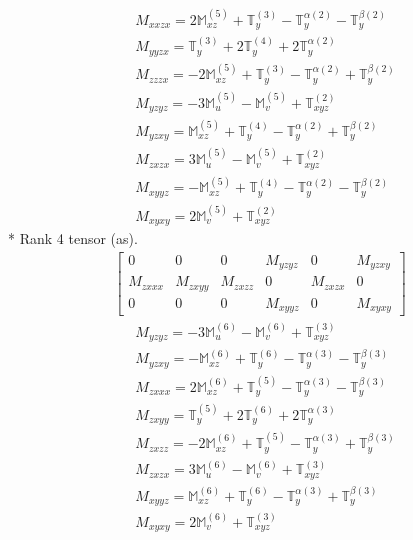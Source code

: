 \documentclass[fleqn,8pt,landscape]{jsarticle}
\begin{document}
\begin{align*}
& M_{xxzx} = 2 \mathbb{M}_{xz}^{(5)} + \mathbb{T}_{y}^{(3)} - \mathbb{T}_{y}^{\alpha(2)} - \mathbb{T}_{y}^{\beta(2)} \\
& M_{yyzx} = \mathbb{T}_{y}^{(3)} + 2 \mathbb{T}_{y}^{(4)} + 2 \mathbb{T}_{y}^{\alpha(2)} \\
& M_{zzzx} = - 2 \mathbb{M}_{xz}^{(5)} + \mathbb{T}_{y}^{(3)} - \mathbb{T}_{y}^{\alpha(2)} + \mathbb{T}_{y}^{\beta(2)} \\
& M_{yzyz} = - 3 \mathbb{M}_{u}^{(5)} - \mathbb{M}_{v}^{(5)} + \mathbb{T}_{xyz}^{(2)} \\
& M_{yzxy} = \mathbb{M}_{xz}^{(5)} + \mathbb{T}_{y}^{(4)} - \mathbb{T}_{y}^{\alpha(2)} + \mathbb{T}_{y}^{\beta(2)} \\
& M_{zxzx} = 3 \mathbb{M}_{u}^{(5)} - \mathbb{M}_{v}^{(5)} + \mathbb{T}_{xyz}^{(2)} \\
& M_{xyyz} = - \mathbb{M}_{xz}^{(5)} + \mathbb{T}_{y}^{(4)} - \mathbb{T}_{y}^{\alpha(2)} - \mathbb{T}_{y}^{\beta(2)} \\
& M_{xyxy} = 2 \mathbb{M}_{v}^{(5)} + \mathbb{T}_{xyz}^{(2)}
\end{align*}
* Rank 4 tensor (as).
\begin{align*}
\begin{bmatrix} 0 & 0 & 0 & M_{yzyz} & 0 & M_{yzxy} \\ M_{zxxx} & M_{zxyy} & M_{zxzz} & 0 & M_{zxzx} & 0 \\ 0 & 0 & 0 & M_{xyyz} & 0 & M_{xyxy} \end{bmatrix}
\end{align*}
\begin{align*}
& M_{yzyz} = - 3 \mathbb{M}_{u}^{(6)} - \mathbb{M}_{v}^{(6)} + \mathbb{T}_{xyz}^{(3)} \\
& M_{yzxy} = - \mathbb{M}_{xz}^{(6)} + \mathbb{T}_{y}^{(6)} - \mathbb{T}_{y}^{\alpha(3)} - \mathbb{T}_{y}^{\beta(3)} \\
& M_{zxxx} = 2 \mathbb{M}_{xz}^{(6)} + \mathbb{T}_{y}^{(5)} - \mathbb{T}_{y}^{\alpha(3)} - \mathbb{T}_{y}^{\beta(3)} \\
& M_{zxyy} = \mathbb{T}_{y}^{(5)} + 2 \mathbb{T}_{y}^{(6)} + 2 \mathbb{T}_{y}^{\alpha(3)} \\
& M_{zxzz} = - 2 \mathbb{M}_{xz}^{(6)} + \mathbb{T}_{y}^{(5)} - \mathbb{T}_{y}^{\alpha(3)} + \mathbb{T}_{y}^{\beta(3)} \\
& M_{zxzx} = 3 \mathbb{M}_{u}^{(6)} - \mathbb{M}_{v}^{(6)} + \mathbb{T}_{xyz}^{(3)} \\
& M_{xyyz} = \mathbb{M}_{xz}^{(6)} + \mathbb{T}_{y}^{(6)} - \mathbb{T}_{y}^{\alpha(3)} + \mathbb{T}_{y}^{\beta(3)} \\
& M_{xyxy} = 2 \mathbb{M}_{v}^{(6)} + \mathbb{T}_{xyz}^{(3)}
\end{align*}
\end{document}
